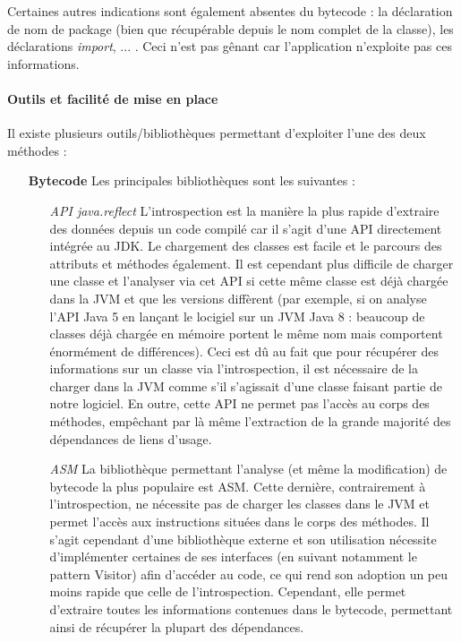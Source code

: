 \documentclass{scrartcl}
\begin{document}
    Certaines autres indications sont également absentes du bytecode : la déclaration de nom de package (bien que récupérable depuis le nom complet de la classe), les déclarations \textit{import}, ... . Ceci n'est pas gênant car l'application n'exploite pas ces informations.
    
    \paragraph{Outils et facilité de mise en place} Il existe plusieurs outils/bibliothèques permettant d'exploiter l'une des deux méthodes :
        \begin{itemize}
            \item[\textbf{Bytecode}] Les principales bibliothèques sont les suivantes :
            \begin{itemize}
                \item[\textit{API java.reflect}\footnotemark] L'introspection est la manière la plus rapide d'extraire des données depuis un code compilé car il s'agit d'une API directement intégrée au JDK. Le chargement des classes est facile et le parcours des attributs et méthodes également. Il est cependant plus difficile de charger une classe et l'analyser via cet API si cette même classe est déjà chargée dans la JVM et que les versions diffèrent (par exemple, si on analyse l'API Java 5 en lançant le locigiel sur un JVM Java 8 : beaucoup de classes déjà chargée en mémoire portent le même nom mais comportent énormément de différences). Ceci est dû au fait que pour récupérer des informations sur un classe via l'introspection, il est nécessaire de la charger dans la JVM comme s'il s'agissait d'une classe faisant partie de notre logiciel. En outre, cette API ne permet pas l'accès au corps des méthodes, empêchant par là même l'extraction de la grande majorité des dépendances de liens d'usage.
                \item[\textit{ASM}\footnotemark] La bibliothèque permettant l'analyse (et même la modification) de bytecode la plus populaire est ASM. Cette dernière, contrairement à l'introspection, ne nécessite pas de charger les classes dans le JVM et permet l'accès aux instructions situées dans le corps des méthodes. Il s'agit cependant d'une bibliothèque externe et son utilisation nécessite d'implémenter certaines de ses interfaces (en suivant notamment le pattern Visitor) afin d'accéder au code, ce qui rend son adoption un peu moins rapide que celle de l'introspection. Cependant, elle permet d'extraire toutes les informations contenues dans le bytecode, permettant ainsi de récupérer la plupart des dépendances.

\end{itemize}
\end{itemize}
\end{document}
